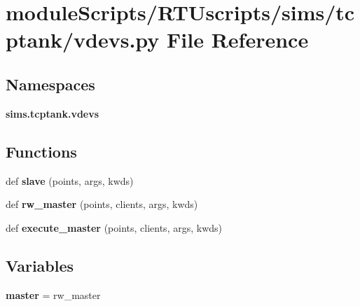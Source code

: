 \section{module\+Scripts/\+R\+T\+Uscripts/sims/tcptank/vdevs.py File Reference}
\label{tcptank_2vdevs_8py}
\subsection*{Namespaces}
\begin{DoxyCompactItemize}
\item 
 {\bf sims.\+tcptank.\+vdevs}
\end{DoxyCompactItemize}
\subsection*{Functions}
\begin{DoxyCompactItemize}
\item 
def {\bf slave} (points, args, kwds)
\item 
def {\bf rw\+\_\+master} (points, clients, args, kwds)
\item 
def {\bf execute\+\_\+master} (points, clients, args, kwds)
\end{DoxyCompactItemize}
\subsection*{Variables}
\begin{DoxyCompactItemize}
\item 
{\bf master} = rw\+\_\+master
\end{DoxyCompactItemize}
